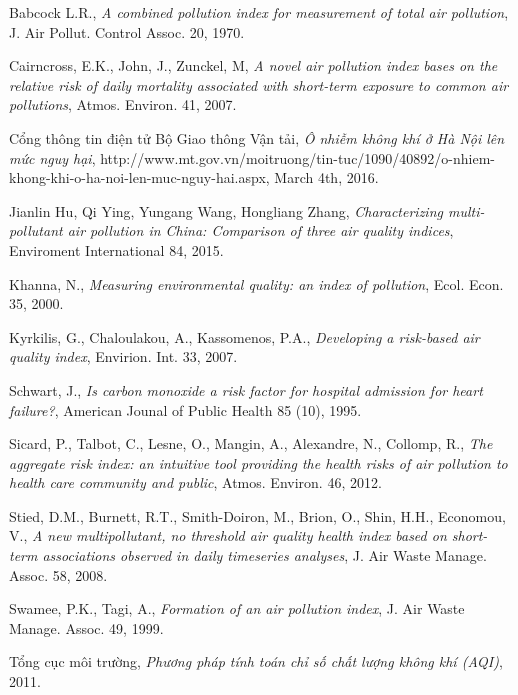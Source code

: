 \documentclass[14pt]{extreport}
\theoremstyle{definition}
\theoremstyle{plain}
\theoremstyle{remark}
\begin{document}
\newpage
{}
\begin{thebibliography}{9}

  Babcock L.R.,
  \emph{A combined pollution index for measurement of total air pollution},
  J. Air Pollut. Control Assoc. 20,
  1970.
  	
	Cairncross, E.K., John, J., Zunckel, M,
	\emph{A novel air pollution index bases on the relative risk of daily mortality associated with short-term exposure to common air pollutions},
	Atmos. Environ. 41,
	2007.

	Cổng thông tin điện tử Bộ Giao thông Vận tải,
	\emph{Ô nhiễm không khí ở Hà Nội lên mức nguy hại},
	http://www.mt.gov.vn/moitruong/tin-tuc/1090/40892/o-nhiem-khong-khi-o-ha-noi-len-muc-nguy-hai.aspx,
	March 4th, 2016.
	
	Jianlin Hu, Qi Ying, Yungang Wang, Hongliang Zhang,
	\emph{Characterizing multi-pollutant air pollution in China: Comparison of three air quality indices},
	Enviroment International 84,
	2015.

	Khanna, N.,
	\emph{Measuring environmental quality: an index of pollution},
	Ecol. Econ. 35,
	2000.

	Kyrkilis, G., Chaloulakou, A., Kassomenos, P.A.,
	\emph{Developing a risk-based air quality index},
	Envirion. Int. 33,
	2007.
	
	Schwart, J.,
	\emph{Is carbon monoxide a risk factor for hospital admission for heart failure?},
	American Jounal of Public Health 85 (10),
	1995.
		
	Sicard, P., Talbot, C., Lesne, O., Mangin, A., Alexandre, N., Collomp, R.,
	\emph{The aggregate risk index: an intuitive tool providing the health risks of air pollution to health care community and public},
	Atmos. Environ. 46,
	2012.
	
	Stied, D.M., Burnett, R.T., Smith-Doiron, M., Brion, O., Shin, H.H., Economou, V.,
	\emph{A new multipollutant, no threshold air quality health index based on short-term associations observed in daily timeseries analyses},
	J. Air Waste Manage. Assoc. 58,
	2008.

	Swamee, P.K., Tagi, A.,
	\emph{Formation of an air pollution index},
	J. Air Waste Manage. Assoc. 49,
	1999.

	Tổng cục môi trường,
	\emph{Phương pháp tính toán chỉ số chất lượng không khí (AQI)},
	2011.	
	

\end{thebibliography}
\end{document}
